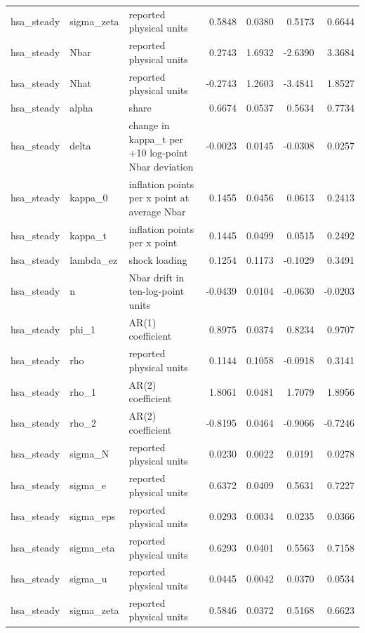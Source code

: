 \begin{tabular}{lllrrrr}
hsa\_steady & sigma\_zeta & reported physical units & 0.5848 & 0.0380 & 0.5173 & 0.6644 \\
hsa\_steady & Nbar & reported physical units & 0.2743 & 1.6932 & -2.6390 & 3.3684 \\
hsa\_steady & Nhat & reported physical units & -0.2743 & 1.2603 & -3.4841 & 1.8527 \\
hsa\_steady & alpha & share & 0.6674 & 0.0537 & 0.5634 & 0.7734 \\
hsa\_steady & delta & change in kappa\_t per +10 log-point Nbar deviation & -0.0023 & 0.0145 & -0.0308 & 0.0257 \\
hsa\_steady & kappa\_0 & inflation points per x point at average Nbar & 0.1455 & 0.0456 & 0.0613 & 0.2413 \\
hsa\_steady & kappa\_t & inflation points per x point & 0.1445 & 0.0499 & 0.0515 & 0.2492 \\
hsa\_steady & lambda\_ez & shock loading & 0.1254 & 0.1173 & -0.1029 & 0.3491 \\
hsa\_steady & n & Nbar drift in ten-log-point units & -0.0439 & 0.0104 & -0.0630 & -0.0203 \\
hsa\_steady & phi\_1 & AR(1) coefficient & 0.8975 & 0.0374 & 0.8234 & 0.9707 \\
hsa\_steady & rho & reported physical units & 0.1144 & 0.1058 & -0.0918 & 0.3141 \\
hsa\_steady & rho\_1 & AR(2) coefficient & 1.8061 & 0.0481 & 1.7079 & 1.8956 \\
hsa\_steady & rho\_2 & AR(2) coefficient & -0.8195 & 0.0464 & -0.9066 & -0.7246 \\
hsa\_steady & sigma\_N & reported physical units & 0.0230 & 0.0022 & 0.0191 & 0.0278 \\
hsa\_steady & sigma\_e & reported physical units & 0.6372 & 0.0409 & 0.5631 & 0.7227 \\
hsa\_steady & sigma\_eps & reported physical units & 0.0293 & 0.0034 & 0.0235 & 0.0366 \\
hsa\_steady & sigma\_eta & reported physical units & 0.6293 & 0.0401 & 0.5563 & 0.7158 \\
hsa\_steady & sigma\_u & reported physical units & 0.0445 & 0.0042 & 0.0370 & 0.0534 \\
hsa\_steady & sigma\_zeta & reported physical units & 0.5846 & 0.0372 & 0.5168 & 0.6623 \\
\bottomrule
\end{tabular}
